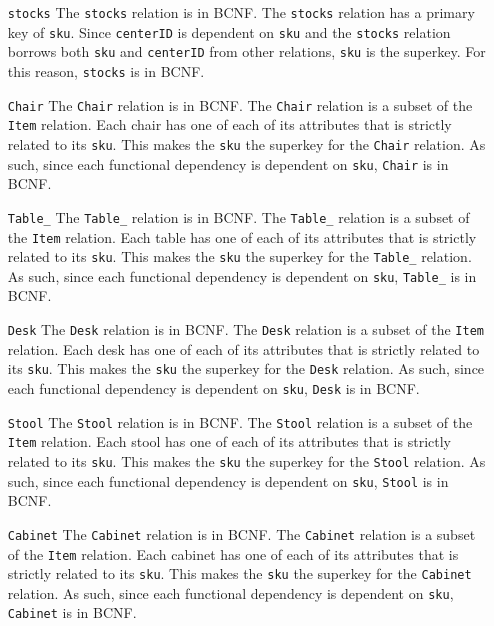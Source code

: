 \documentclass[american,extrafontsizes,12pt,portrait,letterpaper,oneside,onecolumn,final]{memoir}
\newcommand*{\sqli}[1]{\texttt{#1}}
\begin{document}
\begin{enumerate}[leftmargin=*,widest={\texttt{DistributionCenter}}]
\item[\sqli{stocks}]
The \sqli{stocks} relation is in BCNF.
The \sqli{stocks} relation has a primary key of \sqli{sku}.
Since \sqli{centerID} is dependent on \sqli{sku} and the \sqli{stocks} relation borrows both \sqli{sku} and \sqli{centerID} from other relations, \sqli{sku} is the superkey.
For this reason, \sqli{stocks} is in BCNF.

\item[\sqli{Chair}]
The \sqli{Chair} relation is in BCNF.
The \sqli{Chair} relation is a subset of the \sqli{Item} relation.
Each chair has one of each of its attributes that is strictly related to its \sqli{sku}.
This makes the \sqli{sku} the superkey for the \sqli{Chair} relation.
As such, since each functional dependency is dependent on \sqli{sku}, \sqli{Chair} is in BCNF.

\item[\sqli{Table_}]
The \sqli{Table_} relation is in BCNF.
The \sqli{Table_} relation is a subset of the \sqli{Item} relation.
Each table has one of each of its attributes that is strictly related to its \sqli{sku}.
This makes the \sqli{sku} the superkey for the \sqli{Table_} relation.
As such, since each functional dependency is dependent on \sqli{sku}, \sqli{Table_} is in BCNF.

\item[\sqli{Desk}]
The \sqli{Desk} relation is in BCNF.
The \sqli{Desk} relation is a subset of the \sqli{Item} relation.
Each desk has one of each of its attributes that is strictly related to its \sqli{sku}.
This makes the \sqli{sku} the superkey for the \sqli{Desk} relation.
As such, since each functional dependency is dependent on \sqli{sku}, \sqli{Desk} is in BCNF.


\item[\sqli{Stool}]
The \sqli{Stool} relation is in BCNF.
The \sqli{Stool} relation is a subset of the \sqli{Item} relation.
Each stool has one of each of its attributes that is strictly related to its \sqli{sku}.
This makes the \sqli{sku} the superkey for the \sqli{Stool} relation.
As such, since each functional dependency is dependent on \sqli{sku}, \sqli{Stool} is in BCNF.

\item[\sqli{Cabinet}]
The \sqli{Cabinet} relation is in BCNF.
The \sqli{Cabinet} relation is a subset of the \sqli{Item} relation.
Each cabinet has one of each of its attributes that is strictly related to its \sqli{sku}.
This makes the \sqli{sku} the superkey for the \sqli{Cabinet} relation.
As such, since each functional dependency is dependent on \sqli{sku}, \sqli{Cabinet} is in BCNF.



\end{enumerate}
\end{document}
